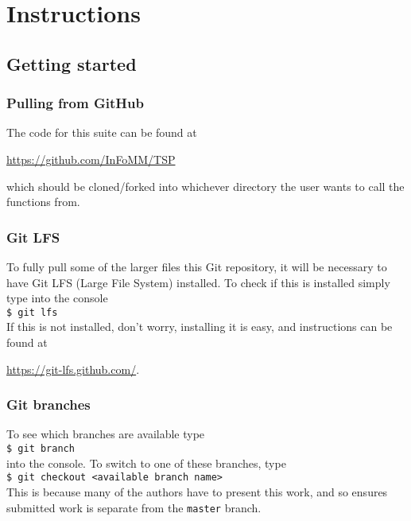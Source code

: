\section{Instructions}
\label{sec:intructions}


\subsection{Getting started}
\label{subsec:getting_started}

\subsubsection{Pulling from GitHub}
\label{subsubsec:pulling_from_github}

The code for this suite can be found at 
\begin{center}
\href{https://github.com/InFoMM/TSP}{https://github.com/InFoMM/TSP}
\end{center}
which should be cloned/forked into whichever directory the user wants to call the functions from.

\subsubsection{Git LFS}
\label{subsubsec:git_lfs}

To fully pull some of the larger files this Git repository, it will be necessary to have Git LFS (Large File System) installed. To check if this is installed simply type into the console \\
\indent
\verb|$ git lfs| \\
If this is not installed, don't worry, installing it is easy, and  instructions can be found at 
\begin{center}
	\href{https://git-lfs.github.com/}{https://git-lfs.github.com/}.
\end{center}


\subsubsection{Git branches}
\label{subsubsec:git_branches}

To see which branches are available type \\
\indent
\verb|$ git branch| \\
into the console. To switch to one of these branches, type \\
\indent
\verb|$ git checkout <available branch name>| \\
This is because many of the authors have to present this work, and so ensures submitted work is separate from the \texttt{master} branch.

